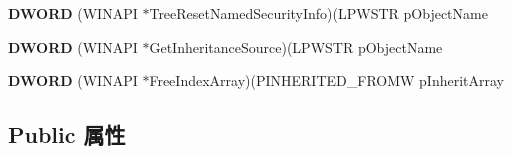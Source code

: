 \begin{DoxyCompactItemize}
{\bfseries D\+W\+O\+RD} (W\+I\+N\+A\+PI $\ast$Tree\+Reset\+Named\+Security\+Info)(L\+P\+W\+S\+TR p\+Object\+Name
\item 
\mbox{\label{struct___n_t_m_a_r_t_a_ab54bd89907191114bce86c89ba511bd5}} 
{\bfseries D\+W\+O\+RD} (W\+I\+N\+A\+PI $\ast$Get\+Inheritance\+Source)(L\+P\+W\+S\+TR p\+Object\+Name
\item 
\mbox{\label{struct___n_t_m_a_r_t_a_a18dc2c6c1177d650766c087826214f50}} 
{\bfseries D\+W\+O\+RD} (W\+I\+N\+A\+PI $\ast$Free\+Index\+Array)(P\+I\+N\+H\+E\+R\+I\+T\+E\+D\+\_\+\+F\+R\+O\+MW p\+Inherit\+Array
\end{DoxyCompactItemize}
\subsection*{Public 属性}
